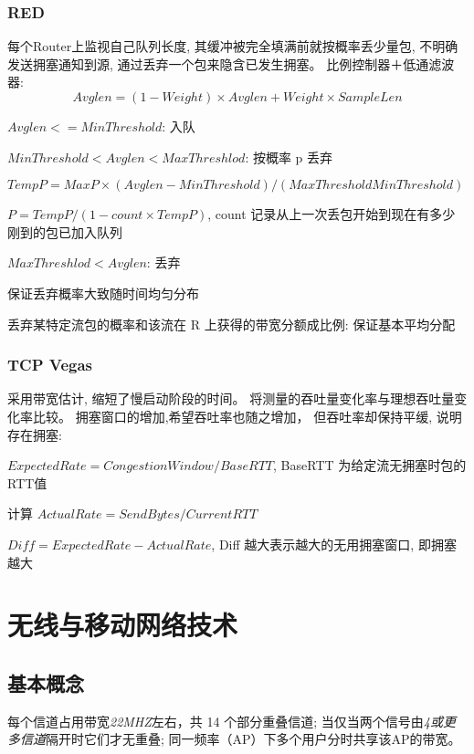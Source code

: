\documentclass[UTF8,cs4size]{ctexart}
\begin{document}
\subsubsection{RED}
每个Router上监视自己队列长度, 其缓冲被完全填满前就按概率丢少量包,
不明确发送拥塞通知到源, 通过丢弃一个包来隐含已发生拥塞。
比例控制器＋低通滤波器:
$$Avglen=(1-Weight)\times Avglen+Weight\times SampleLen$$
\begin{compactitem}
  \item $Avglen <= MinThreshold$: 入队
  \item $MinThreshold < Avglen < MaxThreshlod$: 按概率 p 丢弃
  \item $TempP = MaxP\times (Avglen-MinThreshold)/(MaxThresholdMinThreshold)$
  \item $P = TempP/(1-count\times TempP)$, count 记录从上一次丢包开始到现在有多少刚到的包已加入队列
  \item $MaxThreshlod < Avglen$: 丢弃
  \item 保证丢弃概率大致随时间均匀分布
  \item 丢弃某特定流包的概率和该流在 R 上获得的带宽分额成比例: 保证基本平均分配
\end{compactitem}
\subsubsection{TCP Vegas}
采用带宽估计, 缩短了慢启动阶段的时间。
将测量的吞吐量变化率与理想吞吐量变化率比较。
拥塞窗口的增加,希望吞吐率也随之增加，
但吞吐率却保持平缓, 说明存在拥塞:
\begin{compactitem}
  \item $ExpectedRate=CongestionWindow/BaseRTT$, BaseRTT 为给定流无拥塞时包的RTT值
  \item 计算 $ActualRate = SendBytes/CurrentRTT$
  \item $Diff = ExpectedRate - ActualRate$, Diff 越大表示越大的无用拥塞窗口, 即拥塞越大
\end{compactitem}
\clearpage

\section{无线与移动网络技术}
\subsection{基本概念}
每个信道占用带宽\textit{22MHZ}左右，共 14 个部分重叠信道;
当仅当两个信号由\textit{4或更多信道}隔开时它们才无重叠;
同一频率（AP）下多个用户分时共享该AP的带宽。
\end{document}
